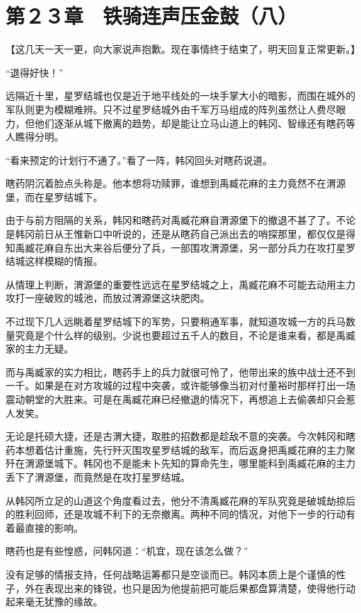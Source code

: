 \section{第２３章　铁骑连声压金鼓（八）}

【这几天一天一更，向大家说声抱歉。现在事情终于结束了，明天回复正常更新。】

“退得好快！”

远隔近十里，星罗结城也仅是近于地平线处的一块手掌大小的暗影，而围在城外的军队则更为模糊难辨。只不过星罗结城外由千军万马组成的阵列虽然让人费尽眼力，但他们逐渐从城下撤离的趋势，却是能让立马山道上的韩冈、智缘还有瞎药等人瞧得分明。

“看来预定的计划行不通了。”看了一阵，韩冈回头对瞎药说道。

瞎药阴沉着脸点头称是。他本想将功赎罪，谁想到禹臧花麻的主力竟然不在渭源堡，而在星罗结城下。

由于与前方阻隔的关系，韩冈和瞎药对禹臧花麻自渭源堡下的撤退不甚了了。不论是韩冈前日从王惟新口中听说的，还是从瞎药自己派出去的哨探那里，都仅仅是得知禹臧花麻自东出大来谷后便分了兵，一部围攻渭源堡，另一部分兵力在攻打星罗结城这样模糊的情报。

从情理上判断，渭源堡的重要性远远在星罗结城之上，禹臧花麻不可能去动用主力攻打一座破败的城池，而放过渭源堡这块肥肉。

不过现下几人远眺着星罗结城下的军势，只要稍通军事，就知道攻城一方的兵马数量究竟是个什么样的级别。少说也要超过五千人的数目，不论是谁来看，都是禹臧家的主力无疑。

而与禹臧家的实力相比，瞎药手上的兵力就很可怜了，他带出来的族中战士还不到一千。如果是在对方攻城的过程中突袭，或许能够像当初对付董裕时那样打出一场震动朝堂的大胜来。可是在禹臧花麻已经撤退的情况下，再想追上去偷袭却只会惹人发笑。

无论是托硕大捷，还是古渭大捷，取胜的招数都是趁敌不意的突袭。今次韩冈和瞎药本想着估计重施，先行歼灭围攻星罗结城的敌军，而后返身把禹臧花麻的主力聚歼在渭源堡城下。韩冈也不是能未卜先知的算命先生，哪里能料到禹臧花麻的主力丢下了渭源堡，而竟然是在攻打星罗结城。

从韩冈所立足的山道这个角度看过去，他分不清禹臧花麻的军队究竟是破城劫掠后的胜利回师，还是攻城不利下的无奈撤离。两种不同的情况，对他下一步的行动有着最直接的影响。

瞎药也是有些惶惑，问韩冈道：“机宜，现在该怎么做？”

没有足够的情报支持，任何战略运筹都只是空谈而已。韩冈本质上是个谨慎的性子，外在表现出来的锋锐，也只是因为他提前把可能后果都盘算清楚，使得他行动起来毫无犹豫的缘故。

